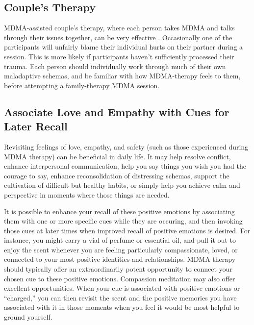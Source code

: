 \documentclass[12pt,letterpaper]{article}
\begin{document}
\subsection{Couple's Therapy}
MDMA-assisted couple's therapy, where each person takes MDMA and talks through their issues together, can be very effective \cite{colbertEvenings}. Occasionally one of the participants will unfairly blame their individual hurts on their partner during a session. This is more likely if participants haven't sufficiently processed their trauma. Each person should individually work through much of their own maladaptive schemas, and be familiar with how MDMA-therapy feels to them, before attempting a family-therapy MDMA session.
\subsection{Associate Love and Empathy with Cues for Later Recall}
Revisiting feelings of love, empathy, and safety (such as those experienced during MDMA therapy) can be beneficial in daily life. It may help resolve conflict, enhance interpersonal communication, help you say things you wish you had the courage to say, enhance reconsolidation of distressing schemas, support the cultivation of difficult but healthy habits, or simply help you achieve calm and perspective in moments where those things are needed.

It is possible to enhance your recall of these positive emotions by associating them with one or more specific cues while they are occuring, and then invoking those cues at later times when improved recall of positive emotions is desired. For instance, you might carry a vial of perfume or essential oil, and pull it out to enjoy the scent whenever you are feeling particularly compassionate, loved, or connected to your most positive identities and relationships. MDMA therapy should typically offer an extraordinarily potent opportunity to connect your chosen cue to these positive emotions. Compassion meditation may also offer excellent opportunities. When your cue is associated with positive emotions or “charged,” you can then revisit the scent and the positive memories you have associated with it in those moments when you feel it would be most helpful to ground yourself.
\end{document}
